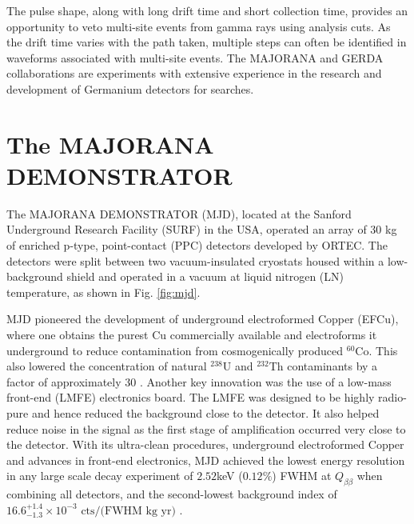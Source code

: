 The pulse shape, along with long drift time and short collection time, provides an opportunity to veto multi-site events from gamma rays using analysis cuts. As the drift time varies with the path taken, multiple steps can often be identified in waveforms associated with multi-site events. The MAJORANA and GERDA collaborations are experiments with extensive experience in the research and development of Germanium detectors for {\onbb} searches.


\section{The MAJORANA DEMONSTRATOR}

The MAJORANA DEMONSTRATOR (MJD), located at the Sanford Underground Research Facility (SURF) in the USA, operated an array of 30 kg of enriched p-type, point-contact (PPC) detectors developed by ORTEC. The detectors were split between two vacuum-insulated cryostats housed within a low-background shield and operated in a vacuum at liquid nitrogen (LN) temperature, as shown in Fig. \ref{fig:mjd}. 

MJD pioneered the development of underground electroformed Copper (EFCu), where one obtains the purest Cu commercially available and electroforms it underground to reduce contamination from cosmogenically produced $^{60}$Co. This also lowered the concentration of natural $^{238}$U and $^{232}$Th contaminants by a factor of approximately 30 \cite{Abgrall:2016cct}. Another key innovation was the use of a low-mass front-end (LMFE) electronics board. The LMFE was designed to be highly radio-pure and hence reduced the background close to the detector. It also helped reduce noise in the signal as the first stage of amplification occurred very close to the detector. With its ultra-clean procedures, underground electroformed Copper and advances in front-end electronics, MJD achieved the lowest energy resolution in any large scale {\onbb} decay experiment of $2.52$keV ($0.12\%$) FWHM at $Q_{\beta\beta}$ when combining all detectors, and the second-lowest background index of $16.6^{+1.4}_{-1.3} \times 10^{-3} \text{ cts/(FWHM kg yr)}$ \cite{Majorana_final}.

